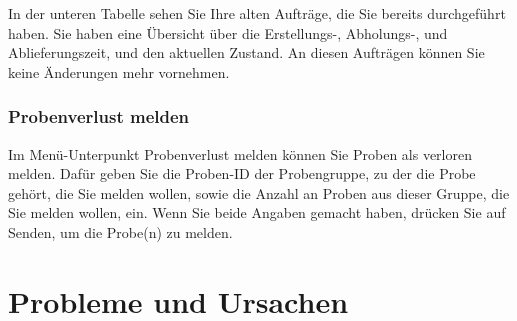 \documentclass[enabledeprecatedfontcommands,fontsize=12pt,paper=a4,twoside]{scrartcl}
\begin{document}
In der unteren Tabelle sehen Sie Ihre alten Aufträge, die Sie bereits durchgeführt haben. Sie haben eine Übersicht über die Erstellungs-, Abholungs-, und Ablieferungszeit, und den aktuellen Zustand. An diesen Aufträgen können Sie keine Änderungen mehr vornehmen. \\

\subsubsection{Probenverlust melden}
Im Menü-Unterpunkt Probenverlust melden können Sie Proben als verloren melden. Dafür geben Sie die Proben-ID der Probengruppe, zu der die Probe gehört, die Sie melden wollen, sowie die Anzahl an Proben aus dieser Gruppe, die Sie melden wollen, ein. Wenn Sie beide Angaben gemacht haben, drücken Sie auf Senden, um die Probe(n) zu melden. \\


\newpage
\section{Probleme und Ursachen}

\end{document}
